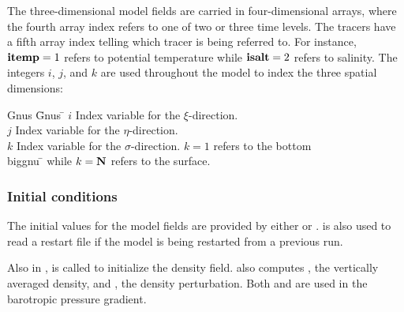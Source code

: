The three-dimensional model fields are carried in four-dimensional
arrays, where the fourth array index refers to one of two or three
time levels. The tracers have a fifth array index telling which
tracer is being referred to.
For instance, $\mbox{\bf itemp}=1$ refers to
potential temperature while $\mbox{\bf isalt}=2$ refers to salinity.  The
integers $i$, $j$, and $k$ are used throughout the model to index
the three spatial dimensions:
\begin{tabbing}
Gnus \= Gnus \= \kill
   \>$i$ \>Index variable for the $\xi$-direction. \\
   \>$j$ \>Index variable for the $\eta$-direction. \\
   \>$k$ \>Index variable for the $\sigma$-direction.  $k = 1$
   refers to the bottom \\
biggnu \= \kill
   \>while $k = \mbox{\bf N}$ refers to the surface.
\end{tabbing}


\subsubsection{Initial conditions}
The initial values for the model fields are provided by either
 or .   is
also used to read a restart file if the model is being restarted from a
previous run.

Also in ,  is called to initialize
the density field.  also computes ,
the vertically averaged density, and , the density
perturbation. Both  and  are used in the barotropic
pressure gradient.


